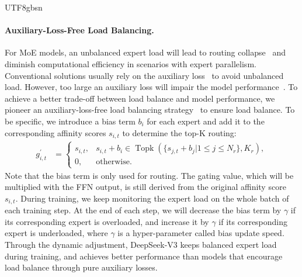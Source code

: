 \documentclass[11pt, a4paper, logo, copyright, nonumbering]{deepseek}
\newcommand{\dsviii}{DeepSeek-V3}
\renewcommand{\leq}{\leqslant}
\begin{document}
\begin{CJK*}{UTF8}{gbsn}
\paragraph{Auxiliary-Loss-Free Load Balancing.}
For MoE models, an unbalanced expert load will lead to routing collapse~\citep{moe} and diminish computational efficiency in scenarios with expert parallelism. 
Conventional solutions usually rely on the auxiliary loss~\citep{switch,gshard} to avoid unbalanced load. 
However, too large an auxiliary loss will impair the model performance~\citep{noaux_tc}. 
To achieve a better trade-off between load balance and model performance, we pioneer an auxiliary-loss-free load balancing strategy~\citep{noaux_tc} to ensure load balance. 
To be specific, we introduce a bias term $b_i$ for each expert and add it to the corresponding affinity scores $s_{i,t}$ to determine the top-K routing:
\begin{align}
    g^{\prime}_{i,t} & = \begin{cases} 
    s_{i,t}, & s_{i,t} + b_i \in \operatorname{Topk} (\{ s_{j, t} + b_j | 1 \leq j \leq N_r \}, K_{r}), \\
    0, & \text{otherwise}.
    \end{cases}
\end{align}
Note that the bias term is only used for routing.
The gating value, which will be multiplied with the FFN output, is still derived from the original affinity score $s_{i,t}$.
During training, we keep monitoring the expert load on the whole batch of each training step.
At the end of each step, we will decrease the bias term by $\gamma$ if its corresponding expert is overloaded, and increase it by $\gamma$ if its corresponding expert is underloaded, where $\gamma$ is a hyper-parameter called bias update speed.
Through the dynamic adjustment, \dsviii{} keeps balanced expert load during training, and achieves better performance than models that encourage load balance through pure auxiliary losses.


\end{CJK*}
\end{document}
